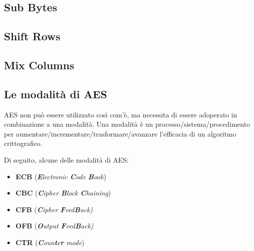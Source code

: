 \subsection{Sub Bytes}

\textsf{\small }

\subsection{Shift Rows}

\textsf{\small }

\subsection{Mix Columns}

\textsf{\small }

\subsection{Le modalità di AES} %

\textsf{\small AES non può essere utilizzato così com'è, ma necessita di essere adoperato in combinazione a una modalità. } %
\textsf{\small Una modalità è un processo/sistema/procedimento per aumentare/incrementare/trasformare/avanzare l'efficacia di un algoritmo crittografico.  } %

\textsf{\small Di seguito, alcune delle modalità di AES: }

\begin{itemize} %
	\item \textsf{\small \textbf{ECB} (\emph{\textbf{E}lectronic \textbf{C}ode \textbf{B}ook})}
	\item \textsf{\small \textbf{CBC} (\emph{\textbf{C}ipher \textbf{B}lock \textbf{C}haining})}
	\item \textsf{\small \textbf{CFB} (\emph{\textbf{C}ipher \textbf{F}eed\textbf{B}ack)}}
	\item \textsf{\small \textbf{OFB} (\emph{\textbf{O}utput \textbf{F}eed\textbf{B}ack)}}
	\item \textsf{\small \textbf{CTR} (\emph{\textbf{C}oun\textbf{t}e\textbf{r} mode})}
\end{itemize} 

